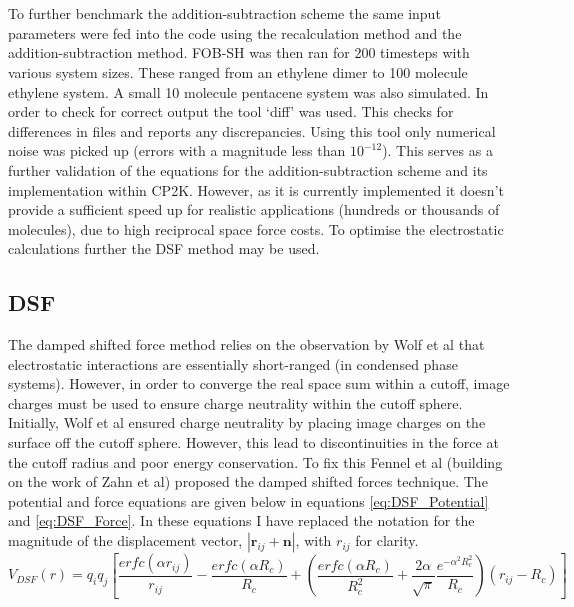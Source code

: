 \\\\
To further benchmark the addition-subtraction scheme the same input parameters were fed into the code using the recalculation method and the addition-subtraction method. FOB-SH was then ran for 200 timesteps with various system sizes. These ranged from an ethylene dimer to 100 molecule ethylene system. A small 10 molecule pentacene system was also simulated. In order to check for correct output the tool `diff' was used. This checks for differences in files and reports any discrepancies. Using this tool only numerical noise was picked up (errors with a magnitude less than $10^{-12}$). This serves as a further validation of the equations for the addition-subtraction scheme and its implementation within CP2K.  However, as it is currently implemented it doesn't provide a sufficient speed up for realistic applications (hundreds or thousands of molecules), due to high reciprocal space force costs. To optimise the electrostatic calculations further the DSF \cite{DSF} method may be used.
\subsection{DSF}
The damped shifted force method relies on the observation by Wolf et al \cite{Wolf99} that electrostatic interactions are essentially short-ranged (in condensed phase systems). However, in order to converge the real space sum within a cutoff, image charges must be used to ensure charge neutrality within the cutoff sphere. Initially, Wolf et al ensured charge neutrality by placing image charges on the surface off the cutoff sphere. However, this lead to discontinuities in the force at the cutoff radius and poor energy conservation. To fix this Fennel et al (building on the work of Zahn et al) proposed the damped shifted forces technique. The potential and force equations are given below in equations \eqref{eq:DSF_Potential} and \eqref{eq:DSF_Force}. In these equations I have replaced the notation for the magnitude of the displacement vector, $|\mathbf{r}_{ij} + \mathbf{n}|$, with $r_{ij}$ for clarity.
\begin{equation}
  V_{DSF}(r) = q_{i} q_{j} \left[ \frac{erfc(\alpha r_{ij})}{r_{ij}}  - \frac{erfc(\alpha R_{c})}{R_{c}} + \left( \frac{erfc(\alpha R_{c})}{R_{c}^2} + \frac{2 \alpha}{\sqrt{\pi}} \frac{e^{-\alpha^2 R_{c}^2}}{R_{c}} \right) (r_{ij} - R_{c}) \right]
  \label{eq:DSF_Potential}
\end{equation}

